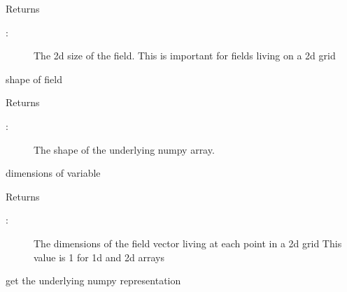 \documentclass[letterpaper,10pt,english]{sphinxmanual}
\begin{document}
\begin{fulllineitems}
\begin{fulllineitems}
\sphinxAtStartPar
Returns
\begin{description}
\item[{:}] \leavevmode
\sphinxAtStartPar
The 2\sphinxhyphen{}d size of the field.
This is important for fields living on a 2\sphinxhyphen{}d grid

\end{description}

\end{fulllineitems}


\begin{fulllineitems}
\label{\detokenize{autoapi/Field/index:Field.Field.shape}}
\sphinxAtStartPar
shape of field

\sphinxAtStartPar
Returns
\begin{description}
\item[{:}] \leavevmode
\sphinxAtStartPar
The shape of the underlying numpy array.

\end{description}

\end{fulllineitems}


\begin{fulllineitems}
\label{\detokenize{autoapi/Field/index:Field.Field.dim}}
\sphinxAtStartPar
dimensions of variable

\sphinxAtStartPar
Returns
\begin{description}
\item[{:}] \leavevmode
\sphinxAtStartPar
The dimensions of the field vector living at each point in a 2\sphinxhyphen{}d grid
This value is 1 for 1\sphinxhyphen{}d and 2\sphinxhyphen{}d arrays

\end{description}

\end{fulllineitems}


\begin{fulllineitems}
\label{\detokenize{autoapi/Field/index:Field.Field.get_vals}}
\sphinxAtStartPar
get the underlying numpy representation


\end{fulllineitems}
\end{fulllineitems}
\end{document}
